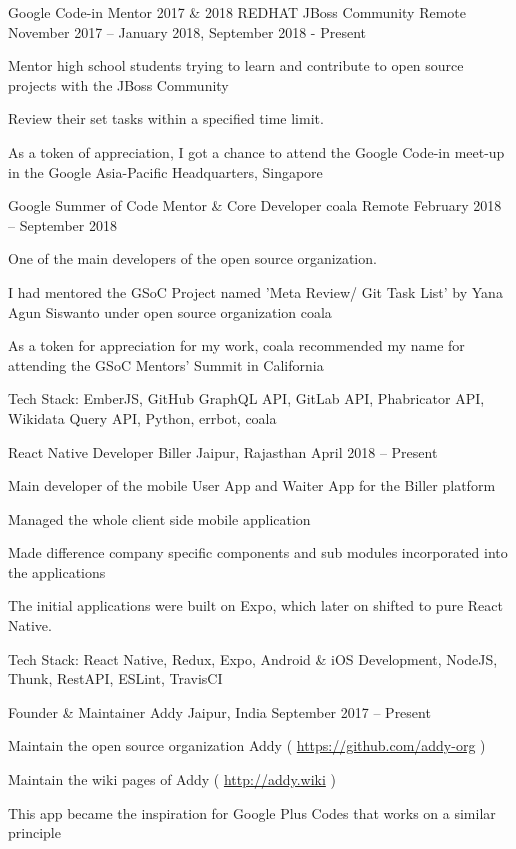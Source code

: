 \begin{cventries}
	\cventry
	{Google Code-in Mentor 2017 \& 2018}
	{REDHAT JBoss Community}
	{Remote}
	{November 2017 – January 2018, \newline September 2018 - Present}
	{\begin{cvitems}
		\item {Mentor high school students trying to learn and contribute to open source projects with the JBoss Community}
		\item {Review their set tasks within a specified time limit.}
		\item {As a token of appreciation, I got a chance to attend the Google Code-in meet-up in the Google Asia-Pacific Headquarters, Singapore}
		\end{cvitems}}
		
	\cventry
	{Google Summer of Code Mentor \& Core Developer}
	{coala}
	{Remote}
	{February 2018 – September 2018}
	{\begin{cvitems}
		\item {One of the main developers of the open source organization.}
		\item {I had mentored the GSoC Project named 'Meta Review/ Git Task List' by Yana Agun Siswanto  under open source organization coala}
		\item {As a token for appreciation for my work, coala recommended my name for attending the GSoC Mentors' Summit in California}
		\item {Tech Stack: EmberJS, GitHub GraphQL API, GitLab API, Phabricator API, Wikidata Query API, Python, errbot, coala}
		\end{cvitems}}
		
	\cventry
	{React Native Developer}
	{Biller}
	{Jaipur, Rajasthan}
	{April 2018 – Present}
	{\begin{cvitems}
		\item {Main developer of the mobile User App and Waiter App for the Biller platform}
		\item {Managed the whole client side mobile application}
		\item {Made difference company specific components and sub modules incorporated into the applications}
		\item {The initial applications were built on Expo, which later on shifted to pure React Native.}
		\item {Tech Stack: React Native, Redux, Expo, Android \& iOS Development, NodeJS, Thunk, RestAPI, ESLint, TravisCI}
		\end{cvitems}}
		
    \cventry
	{Founder \& Maintainer}
	{Addy}
	{Jaipur, India}
	{September 2017 – Present}
	{\begin{cvitems}
		\item {Maintain the open source organization Addy ( \url{https://github.com/addy-org} )}
		\item {Maintain the wiki pages of Addy ( \url{http://addy.wiki} )}
		\item {This app became the inspiration for Google Plus Codes that works on a similar principle}
		\end{cvitems}}
		
\end{cventries}
